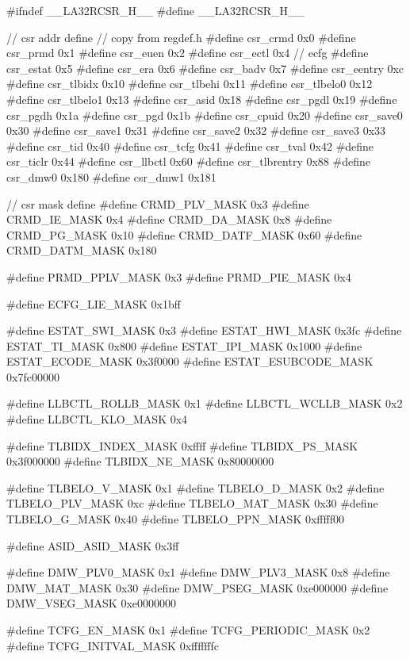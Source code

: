 \begin{CodeBlock}[language=BookC]
#ifndef __LA32RCSR_H__
#define __LA32RCSR_H__

// csr addr define
// copy from regdef.h
#define csr_crmd      0x0
#define csr_prmd      0x1
#define csr_euen      0x2
#define csr_ectl      0x4 // ecfg
#define csr_estat     0x5
#define csr_era       0x6
#define csr_badv      0x7
#define csr_eentry     0xc
#define csr_tlbidx    0x10
#define csr_tlbehi    0x11
#define csr_tlbelo0    0x12
#define csr_tlbelo1    0x13
#define csr_asid      0x18
#define csr_pgdl      0x19
#define csr_pgdh      0x1a
#define csr_pgd       0x1b
#define csr_cpuid    0x20
#define csr_save0     0x30
#define csr_save1     0x31
#define csr_save2     0x32
#define csr_save3     0x33
#define csr_tid       0x40
#define csr_tcfg      0x41
#define csr_tval      0x42
#define csr_ticlr     0x44
#define csr_llbctl    0x60
#define csr_tlbrentry 0x88
#define csr_dmw0      0x180
#define csr_dmw1      0x181

// csr mask define
#define CRMD_PLV_MASK       0x3
#define CRMD_IE_MASK        0x4
#define CRMD_DA_MASK        0x8
#define CRMD_PG_MASK        0x10
#define CRMD_DATF_MASK      0x60
#define CRMD_DATM_MASK      0x180

#define PRMD_PPLV_MASK      0x3
#define PRMD_PIE_MASK       0x4

#define ECFG_LIE_MASK       0x1bff

#define ESTAT_SWI_MASK      0x3
#define ESTAT_HWI_MASK      0x3fc
#define ESTAT_TI_MASK       0x800
#define ESTAT_IPI_MASK      0x1000
#define ESTAT_ECODE_MASK    0x3f0000
#define ESTAT_ESUBCODE_MASK 0x7fc00000

#define LLBCTL_ROLLB_MASK   0x1
#define LLBCTL_WCLLB_MASK   0x2
#define LLBCTL_KLO_MASK     0x4

#define TLBIDX_INDEX_MASK   0xffff
#define TLBIDX_PS_MASK      0x3f000000
#define TLBIDX_NE_MASK      0x80000000

#define TLBELO_V_MASK       0x1
#define TLBELO_D_MASK       0x2
#define TLBELO_PLV_MASK     0xc
#define TLBELO_MAT_MASK     0x30
#define TLBELO_G_MASK       0x40
#define TLBELO_PPN_MASK     0xfffff00

#define ASID_ASID_MASK      0x3ff

#define DMW_PLV0_MASK       0x1
#define DMW_PLV3_MASK       0x8
#define DMW_MAT_MASK        0x30
#define DMW_PSEG_MASK       0xe000000
#define DMW_VSEG_MASK       0xe0000000

#define TCFG_EN_MASK        0x1
#define TCFG_PERIODIC_MASK  0x2
#define TCFG_INITVAL_MASK   0xfffffffc


\end{CodeBlock}
